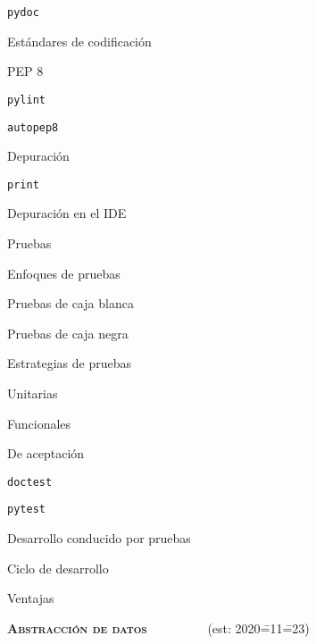 \begin{longenum}
\begin{longenum}
\begin{longenum}
            \item \texttt{pydoc}
            \item Estándares de codificación
            \begin{longenum}
                \item PEP 8
                \item \texttt{pylint}
                \item \texttt{autopep8}
            \end{longenum}
        \end{longenum}
        \item Depuración
        \begin{longenum}
            \item \texttt{print}
            \item Depuración en el IDE
        \end{longenum}
        \item Pruebas
        \begin{longenum}
            \item Enfoques de pruebas
            \begin{longenum}
                \item Pruebas de caja blanca
                \item Pruebas de caja negra
            \end{longenum}
            \item Estrategias de pruebas
            \begin{longenum}
                \item Unitarias
                \item Funcionales
                \item De aceptación
            \end{longenum}
            \item \texttt{doctest}
            \item \texttt{pytest}
            \item Desarrollo conducido por pruebas
            \begin{longenum}
                \item Ciclo de desarrollo
                \item Ventajas
            \end{longenum}
        \end{longenum}
    \end{longenum}
    \item \textbf{\textsc{Abstracción de datos}} \ \ \ \ \ \ \ \ \ (est: 2020\==11\==23)

\end{longenum}
